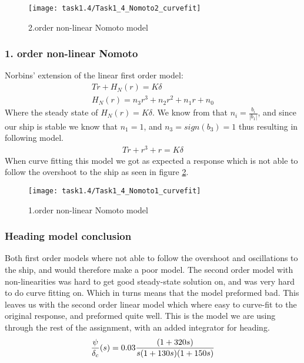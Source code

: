 \begin{figure}[H]
    \centering
    \texttt{[image: task1.4/Task1\_4\_Nomoto2\_curvefit]}
    \caption{2.order non-linear Nomoto model}
    \label{fig:nomoto2_nonlin}
\end{figure}

\subsubsection*{1. order non-linear Nomoto}
Norbins' extension of the linear first order model:
\begin{equation}
\begin{split}
	T\dot{r}+H_N(r)=K\delta \\
	H_N(r) = n_3r^3 + n_2r^2 + n_1r + n_0
\end{split}
\end{equation}
Where the steady state of $H_N(r)=K\delta$. We know from \cite{fossen_2011} that $n_i = \frac{b_i}{|b_1|}$, and since our ship is stable we know that $n_1=1$, and $n_3 = sign(b_3)=1$ thus resulting in following model.
\begin{equation}
\begin{split}
	T\dot{r}+r^3 + r=K\delta 
\end{split}
\end{equation}
When curve fitting this model we got as expected a response which is not able to follow the overshoot to the ship as seen in figure \ref{fig:nomoto1_nonlin}.

\begin{figure}[H]
    \centering
    \texttt{[image: task1.4/Task1\_4\_Nomoto1\_curvefit]}
    \caption{1.order non-linear Nomoto model}
    \label{fig:nomoto1_nonlin}
\end{figure}

\subsubsection*{Heading model conclusion}
Both first order models where not able to follow the overshoot and oscillations to the ship, and would therefore make a poor model. The second order model with non-linearities was hard to get good steady-state solution on, and was very hard to do curve fitting on. Which in turns means that the model preformed bad. This leaves us with the second order linear model which where easy to curve-fit to the original response, and preformed quite well. This is the model we are using through the rest of the assignment, with an added integrator for heading. 
\begin{equation}
    \frac{\psi}{\delta_c}(s) =0.03 \frac{(1+320 s)}{s(1+130 s) (1+150 s) } \\
\end{equation}

